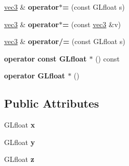 \begin{DoxyCompactItemize}
\item 
\hypertarget{struct_angel_1_1vec3_adaf3e259a12b08fea430c9f6b6262e34}{\hyperlink{struct_angel_1_1vec3}{vec3} \& {\bfseries operator$\ast$=} (const \-G\-Lfloat s)}\label{struct_angel_1_1vec3_adaf3e259a12b08fea430c9f6b6262e34}

\item 
\hypertarget{struct_angel_1_1vec3_ac7c1dbd993e7342e6b0a6e994a05d5af}{\hyperlink{struct_angel_1_1vec3}{vec3} \& {\bfseries operator$\ast$=} (const \hyperlink{struct_angel_1_1vec3}{vec3} \&v)}\label{struct_angel_1_1vec3_ac7c1dbd993e7342e6b0a6e994a05d5af}

\item 
\hypertarget{struct_angel_1_1vec3_a34be6dd53cc61263f9d1a189d65237c8}{\hyperlink{struct_angel_1_1vec3}{vec3} \& {\bfseries operator/=} (const \-G\-Lfloat s)}\label{struct_angel_1_1vec3_a34be6dd53cc61263f9d1a189d65237c8}

\item 
\hypertarget{struct_angel_1_1vec3_a81f4a99d68722e756664907dcb07fb92}{{\bfseries operator const G\-Lfloat $\ast$} () const }\label{struct_angel_1_1vec3_a81f4a99d68722e756664907dcb07fb92}

\item 
\hypertarget{struct_angel_1_1vec3_ab92761f9bc4454117c1dd39a7d87c1b0}{{\bfseries operator G\-Lfloat $\ast$} ()}\label{struct_angel_1_1vec3_ab92761f9bc4454117c1dd39a7d87c1b0}

\end{DoxyCompactItemize}
\subsection*{\-Public \-Attributes}
\begin{DoxyCompactItemize}
\item 
\hypertarget{struct_angel_1_1vec3_a758dbe298cc37615770c30a73066253d}{\-G\-Lfloat {\bfseries x}}\label{struct_angel_1_1vec3_a758dbe298cc37615770c30a73066253d}

\item 
\hypertarget{struct_angel_1_1vec3_a02608203e694798c3118d5b55a0e0048}{\-G\-Lfloat {\bfseries y}}\label{struct_angel_1_1vec3_a02608203e694798c3118d5b55a0e0048}

\item 
\hypertarget{struct_angel_1_1vec3_afa2e7231c4170ddedb556ef5f7941cbc}{\-G\-Lfloat {\bfseries z}}\label{struct_angel_1_1vec3_afa2e7231c4170ddedb556ef5f7941cbc}

\end{DoxyCompactItemize}
